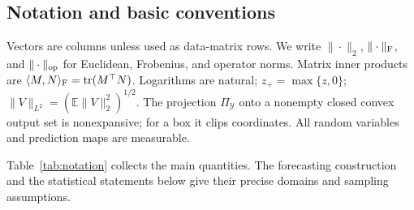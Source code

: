 \subsection{Notation and basic conventions}
\label{sec:notation}

Vectors are columns unless used as data-matrix rows. We write $\|\cdot\|_2$,
$\|\cdot\|_{\rm F}$, and $\|\cdot\|_{\rm op}$ for Euclidean, Frobenius,
and operator norms. Matrix inner products are
$\langle M,N\rangle_{\rm F}=\operatorname{tr}(M^\top N)$.
Logarithms are natural; $z_+=\max\{z,0\}$;
$\|V\|_{L^2}=(\mathbb E\|V\|_2^2)^{1/2}$.
The projection $\Pi_{\mathcal Y}$ onto a nonempty closed convex output
set is nonexpansive; for a box it clips coordinates. All random variables
and prediction maps are measurable.

Table~\ref{tab:notation} collects the main quantities. The forecasting
construction and the statistical statements below give their precise domains
and sampling assumptions.

